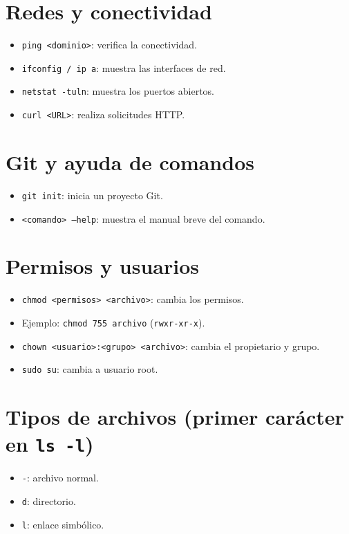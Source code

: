 \documentclass{article}
\begin{document}
\section{Redes y conectividad}
\begin{itemize}
    \item \texttt{ping <dominio>}: verifica la conectividad.
    \item \texttt{ifconfig / ip a}: muestra las interfaces de red.
    \item \texttt{netstat -tuln}: muestra los puertos abiertos.
    \item \texttt{curl <URL>}: realiza solicitudes HTTP.
\end{itemize}

\section{Git y ayuda de comandos}
\begin{itemize}
    \item \texttt{git init}: inicia un proyecto Git.
    \item \texttt{<comando> --help}: muestra el manual breve del comando.
\end{itemize}

\section{Permisos y usuarios}
\begin{itemize}
    \item \texttt{chmod <permisos> <archivo>}: cambia los permisos.
    \item Ejemplo: \texttt{chmod 755 archivo} (\texttt{rwxr-xr-x}).
    \item \texttt{chown <usuario>:<grupo> <archivo>}: cambia el propietario y grupo.
    \item \texttt{sudo su}: cambia a usuario root.
\end{itemize}

\section{Tipos de archivos (primer carácter en \texttt{ls -l})}
\begin{itemize}
    \item \texttt{-}: archivo normal.
    \item \texttt{d}: directorio.
    \item \texttt{l}: enlace simbólico.
\end{itemize}
\end{document}
